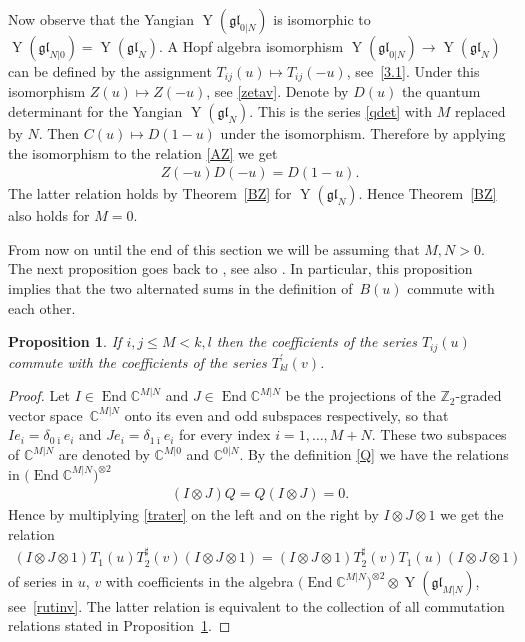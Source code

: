 \documentclass[pdftex]{sigma}
\numberwithin{equation}{section}
\newtheorem{Proposition}[Theorem]{Proposition}
\def\bi{{\bar\imath }}
\def\CC{{\mathbb{C}}}
\def\CMN{\CC^{M|N}}
\def\de{\delta}
\def\End{\operatorname{End}}
\def\glMN{\mathfrak{gl}_{M|N}}
\def\le{\leqslant}
\def\ot{\otimes}
\def\TP{T^{\prime}}
\def\TS{T^{\sharp}}
\def\YMN{\operatorname{Y}(\glMN)}
\def\ZZ{\mathbb{Z}}
\begin{document}
Now observe that the Yangian $\operatorname{Y}(\mathfrak{gl}_{0 |N})$
is isomorphic to
$\operatorname{Y}(\mathfrak{gl}_{N| 0} )=
\operatorname{Y}(\mathfrak{gl}_N) .$
A Hopf algebra isomorphism
$\operatorname{Y}(\mathfrak{gl}_{0 |N})\to
\operatorname{Y}(\mathfrak{gl}_{N} )$
can be defined by the assignment $T_{ij}(u)\mapsto T_{ij}(-u) $,
see~\eqref{3.1}. Under this isomorphism $Z(u)\mapsto Z(-u) $, see
\eqref{zetav}. Denote by $D(u)$ the quantum determinant for
the Yangian
$\operatorname{Y}(\mathfrak{gl}_{N}) $. This is the series
\eqref{qdet} with $M$ replaced by $N $. Then $C(u)\mapsto D (1-u)$
under the isomorphism. Therefore by applying the isomorphism to the
relation \eqref{AZ} we get
\begin{gather*}
Z(-u) D(-u)=D (1-u) .
\end{gather*}
The latter relation holds by
Theorem~\ref{BZ} for
$\operatorname{Y}(\mathfrak{gl}_{N} ) $.
Hence Theorem~\ref{BZ} also holds for $M=0 $.

From now on until the end of this section
we will be assuming that $M,N>0 $.
The next proposition goes back to \cite[Theorem~2.4]{C}, see also
\cite[Section~1]{G2}.
In particular, this proposition implies
that the two alternated sums in the definition of~$B(u)$ commute with each other.

\begin{Proposition}\label{L3}
If $i,j\le M<k,l$ then the coefficients of the series
$T_{ij}(u)$ commute with the coefficients of the series $\TP_{kl}(v) $.
\end{Proposition}

\begin{proof}Let $I\in\End\CMN$ and $J\in\End\CMN$
be the projections of the $\ZZ_2$-graded vector space~$\CMN$ onto
its even and odd subspaces respectively, so that
$I e_i=\de_{0 \bi} e_i$ and
$J e_i=\de_{1 \bi} e_i$
for every index $i=1,\dots, M+N $.
These two subspaces of $\CMN$ are denoted by
$\CC^{M| 0}$ and $\CC^{0 |N}$.
By the definition \eqref{Q} we have the relations in %
$\big(\End\CMN\big)^{\ot2}$
\begin{gather}
\label{IJQ}
(I\ot J) Q=
Q (I\ot J)=0 .
\end{gather}
Hence by multiplying \eqref{trater}
on the left and on the right by $I\ot J\ot1$ we get
the relation
\begin{gather}\label{referee2}
(I\ot J\ot1) T_1(u) \TS_2(v) (I\ot J\ot1)=
(I\ot J\ot1) \TS_2(v) T_1(u) (I\ot J\ot1)
\end{gather}
of series in $u$, $v$ with coefficients
in the algebra $\big(\End\CMN\big)^{\ot2}\ot\YMN $,
see~\eqref{rutinv}. The latter relation is equivalent to the collection of all
commutation relations stated in Proposition~\ref{L3}.
\end{proof}
\end{document}
